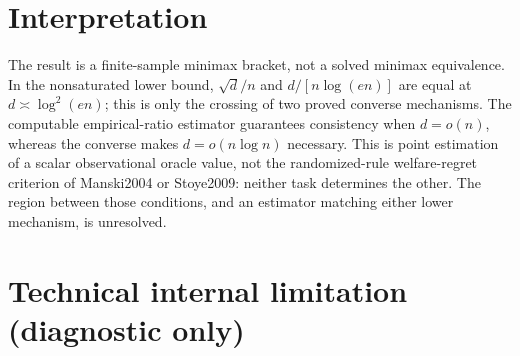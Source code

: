 \documentclass{article}
\begin{document}
\section{Interpretation}

The result is a finite-sample minimax bracket, not a solved minimax equivalence. In the nonsaturated lower bound, \(\sqrt d/n\) and \(d/[n\log(en)]\) are equal at \(d\asymp\log^2(en)\); this is only the crossing of two proved converse mechanisms. The computable empirical-ratio estimator guarantees consistency when \(d=o(n)\), whereas the converse makes \(d=o(n\log n)\) necessary. This is point estimation of a scalar observational oracle value, not the randomized-rule welfare-regret criterion of Manski2004 or Stoye2009: neither task determines the other. The region between those conditions, and an estimator matching either lower mechanism, is unresolved.

\section*{Technical internal limitation (diagnostic only)}
\end{document}
